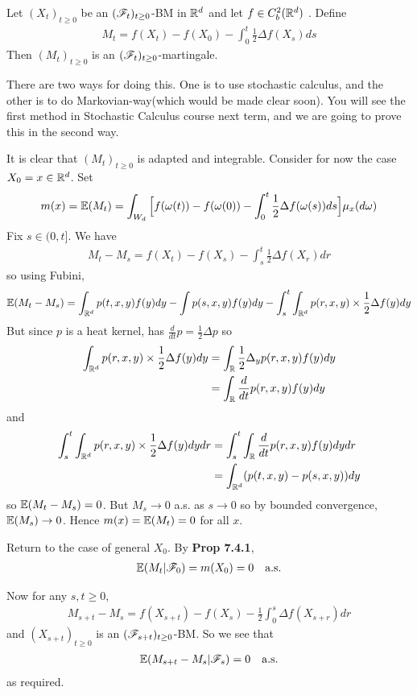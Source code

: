 \documentclass[10pt,a4paper]{report}
\newenvironment{proof}
{\begin{changemargin}{1cm}{0.5cm} 
	}%
	{\end{changemargin}
}
\begin{document}
 Let $(X_t)_{t\geq 0}$ be an $(\mathscr{F}_t)_{t\geq 0}$-BM in $\mathbb{R}^d$ and let $f\in C_b^2(\mathbb{R}^d)$ . Define
\begin{align*}
M_t = f(X_t) - f(X_0) - \int_0^t \frac{1}{2} \Delta f(X_s) ds
\end{align*}
Then $(M_t)_{t\geq 0}$ is an $(\mathscr{F}_t)_{t\geq 0}$-martingale.
\s

There are two ways for doing this. One is to use stochastic calculus, and the other is to do Markovian-way(which would be made clear soon). You will see the first method in Stochastic Calculus course next term, and we are going to prove this in the second way.
\begin{proof}
\pf It is clear that $(M_t)_{t\geq 0}$ is adapted and integrable. Consider for now the case $X_0 =x \in \mathbb{R}^d$. Set
\begin{align*}
m(x) = \mathbb{E}(M_t) = \int_{W_d} \Big[ f(\omega(t)) - f(\omega(0)) -\int_0^t \frac{1}{2} \Delta f(\omega(s)) ds \Big] \mu_x(d\omega) 
\end{align*}
Fix $s\in (0,t]$. We have
\begin{align*}
M_t - M_s = f(X_t) - f(X_s) - \int_s^t \frac{1}{2} \Delta f(X_r) dr
\end{align*}
so using Fubini,
\begin{align*}
\mathbb{E}(M_t - M_s) = \int_{\mathbb{R}^d} p(t,x,y)f(y)dy - \int p(s,x,y) f(y)dy - \int_s^t \int_{\mathbb{R}^d} p(r,x,y) \times \frac{1}{2}\Delta f(y) dy
\end{align*}
But since $p$ is a heat kernel, has $\frac{d}{dt}p = \frac{1}{2} \Delta p$ so
\begin{align*}
\int_{\mathbb{R}^d} p(r,x,y) \times \frac{1}{2} \Delta f(y) dy &= \int_{\mathbb{R}} \frac{1}{2} \Delta_y p(r,x,y) f(y) dy \\
&= \int_{\mathbb{R}} \frac{d}{dt} p(r,x,y) f(y) dy
\end{align*}
and
\begin{align*}
\int_s^t \int_{\mathbb{R}^d} p(r,x,y) \times \frac{1}{2} \Delta f(y) dy dr &= \int_s^t \int_{\mathbb{R}} \frac{d}{dt} p(r,x,y) f(y) dy dr \\
&= \int_{\mathbb{R}^d} (p(t,x,y) - p(s,x,y) ) dy
\end{align*}
so $\mathbb{E}(M_t -M_s) =0$. But $M_s \rightarrow 0$ a.s. as $s\rightarrow 0$ so by bounded convergence, $\mathbb{E}(M_s) \rightarrow 0$. Hence $m(x) = \mathbb{E}(M_t) =0$ for all $x$.

\quad Return to the case of general $X_0$. By \textbf{Prop 7.4.1},
\begin{align*}
\mathbb{E}(M_t | \mathscr{F}_0) = m(X_0) =0 \quad \text{a.s.}
\end{align*}
\s

Now for any $s,t\geq 0$,
\begin{align*}
M_{s+t} - M_s = f(X_{s+t}) - f(X_s) - \frac{1}{2}\int_0^s \Delta f(X_{s+r}) dr
\end{align*}
and $(X_{s+t})_{t\geq 0}$ is an $(\mathscr{F}_{s+t})_{t\geq 0}$-BM. So we see that 
\begin{align*}
\mathbb{E}(M_{s+t} - M_s | \mathscr{F}_s)  =0\quad \text{a.s.}
\end{align*}
as required.

\eop
\end{proof}
\end{document}
